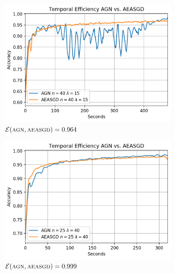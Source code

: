 \begin{figure}[H]
  \centering
  \begin{subfigure}{.3\textwidth}
    \centering
    \includegraphics[width=\linewidth]{resources/images/agn_aeasgd_temporal_worst}
    \caption{$\mathcal{E}(\textsc{agn}, \textsc{aeasgd}) = 0.964$}
  \end{subfigure}
  \begin{subfigure}{.3\textwidth}
    \centering
    \includegraphics[width=\linewidth]{resources/images/agn_aeasgd_temporal_equal}
    \caption{$\mathcal{E}(\textsc{agn}, \textsc{aeasgd}) = 0.999$}
  \end{subfigure}
  \begin{subfigure}{.3\textwidth}
    \centering

\end{subfigure}
\end{figure}

